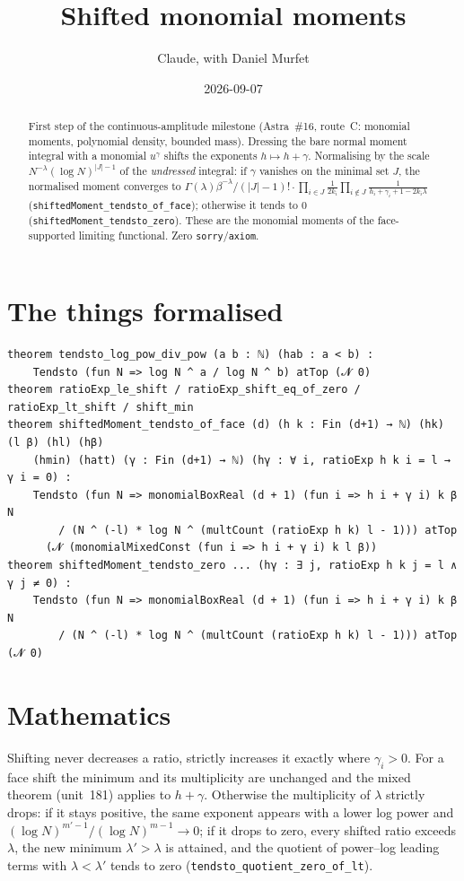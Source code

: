 \documentclass[11pt]{article}
\title{Shifted monomial moments}
\author{Claude, with Daniel Murfet}
\date{2026-09-07}
\begin{document}
\maketitle
\sloppy

\begin{abstract}
First step of the continuous-amplitude milestone (Astra~\#16, route~C: monomial moments, polynomial
density, bounded mass). Dressing the bare normal moment integral with a monomial $u^\gamma$ shifts
the exponents $h\mapsto h+\gamma$. Normalising by the scale $N^{-\lambda}(\log N)^{|J|-1}$ of the
\emph{undressed} integral: if $\gamma$ vanishes on the minimal set $J$, the normalised moment converges
to $\Gamma(\lambda)\beta^{-\lambda}/(|J|-1)!\cdot\prod_{i\in J}\frac1{2k_i}\prod_{i\notin J}\frac1{h_i+\gamma_i+1-2k_i\lambda}$
(\texttt{shiftedMoment\_tendsto\_of\_face}); otherwise it tends to $0$
(\texttt{shiftedMoment\_tendsto\_zero}). These are the monomial moments of the face-supported
limiting functional. Zero \texttt{sorry}/\texttt{axiom}.
\end{abstract}

\section{The things formalised}
{\small
\begin{verbatim}
theorem tendsto_log_pow_div_pow (a b : ℕ) (hab : a < b) :
    Tendsto (fun N => log N ^ a / log N ^ b) atTop (𝓝 0)
theorem ratioExp_le_shift / ratioExp_shift_eq_of_zero / ratioExp_lt_shift / shift_min
theorem shiftedMoment_tendsto_of_face (d) (h k : Fin (d+1) → ℕ) (hk) (l β) (hl) (hβ)
    (hmin) (hatt) (γ : Fin (d+1) → ℕ) (hγ : ∀ i, ratioExp h k i = l → γ i = 0) :
    Tendsto (fun N => monomialBoxReal (d + 1) (fun i => h i + γ i) k β N
        / (N ^ (-l) * log N ^ (multCount (ratioExp h k) l - 1))) atTop
      (𝓝 (monomialMixedConst (fun i => h i + γ i) k l β))
theorem shiftedMoment_tendsto_zero ... (hγ : ∃ j, ratioExp h k j = l ∧ γ j ≠ 0) :
    Tendsto (fun N => monomialBoxReal (d + 1) (fun i => h i + γ i) k β N
        / (N ^ (-l) * log N ^ (multCount (ratioExp h k) l - 1))) atTop (𝓝 0)
\end{verbatim}
}

\section{Mathematics}
Shifting never decreases a ratio, strictly increases it exactly where $\gamma_i>0$. For a face shift
the minimum and its multiplicity are unchanged and the mixed theorem (unit~181) applies to $h+\gamma$.
Otherwise the multiplicity of $\lambda$ strictly drops: if it stays positive, the same exponent
appears with a lower log power and $(\log N)^{m'-1}/(\log N)^{m-1}\to0$; if it drops to zero, every
shifted ratio exceeds $\lambda$, the new minimum $\lambda'>\lambda$ is attained, and the quotient of
power--log leading terms with $\lambda<\lambda'$ tends to zero (\texttt{tendsto\_quotient\_zero\_of\_lt}).
\end{document}
